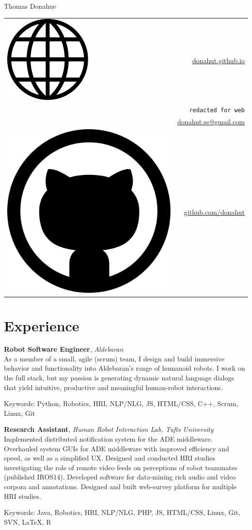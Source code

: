 \documentclass[10pt, letter]{article}
\newcommand*\globe{\includegraphics[height=1.6ex]{globe.pdf}}
\newcommand*\github{\includegraphics[height=2ex]{github.pdf}}
\newcommand{\years}[1]{\marginnote{\footnotesize #1}}
\newenvironment{desc*}{
  \begin{description}
    \setlength{\itemsep}{0.2pt}
    \setlength{\parskip}{-1pt}
    \setlength{\parsep}{0pt}
  }{
  \end{description}
}
\begin{document}
\begin{minipage}[t]{0.55\textwidth}
  {\Huge Thomas Donahue}
\end{minipage}
\begin{minipage}[t]{0.45\textwidth}
  \flushright 
  \begin{tabular}[h]{lr}
    \globe{}    & \href{http://donahut.github.io}{donahut.github.io}\\    
    \Phone{}    & \texttt{redacted for web}\\
    \Envelope{} & \href{mailto:donahut.se@gmail.com}{donahut.se@gmail.com}\\    
    \github{}   & \href{http://www.github.com/donahut}{github.com/donahut}
  \end{tabular}
\end{minipage}

\section*{Experience}
\years{Mar 2014--}
\textbf{Robot Software Engineer}, \textsl{Aldebaran}\\
As a member of a small, agile (scrum) team, I design and build
immersive behavior and functionality into Aldebaran's range of
humanoid robots. I work on the full stack, but my passion is
generating dynamic natural language dialogs that yield intuitive,
productive and meaningful human-robot interactions.
\begin{desc*}
\item[Keywords:] Python, Robotics, HRI, NLP/NLG, JS, HTML/CSS, C++, Scrum,
  Linux, Git
\end{desc*}

\years{2012 - 2014} 
\textbf{Research Assistant}, 
\textsl{Human Robot Interaction Lab, Tufts University} \\
Implemented distributed notification system for the ADE middleware.
Overhauled system GUIs for ADE middleware with improved efficiency and
speed, as well as a simplified UX. Designed and conducted HRI studies
investigating the role of remote video feeds on perceptions of robot
teammates (published IROS14). Developed software for
data-mining rich audio and video corpora and annotations. Designed and
built web-survey platform for multiple HRI studies.
\begin{desc*}
\item[Keywords:] Java, Robotics, HRI, NLP/NLG, PHP, JS, HTML/CSS, Linux, Git,
  SVN, \LaTeX, R
\end{desc*}
\end{document}
